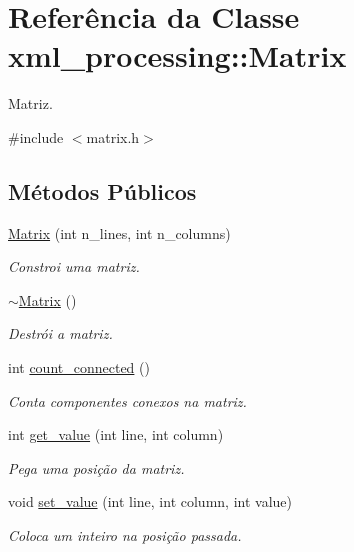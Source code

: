 \hypertarget{classxml__processing_1_1Matrix}{}\section{Referência da Classe xml\+\_\+processing\+:\+:Matrix}
\label{classxml__processing_1_1Matrix}


Matriz.  




{\ttfamily \#include $<$matrix.\+h$>$}

\subsection*{Métodos Públicos}
\begin{DoxyCompactItemize}
\item 
\hyperlink{classxml__processing_1_1Matrix_a5862906904cd901685f72cc703084d83}{Matrix} (int n\+\_\+lines, int n\+\_\+columns)
\begin{DoxyCompactList}\small\item\em Constroi uma matriz. \end{DoxyCompactList}\item 
\hyperlink{classxml__processing_1_1Matrix_a38b41757af695c49ed75cdfabfd85c55}{$\sim$\+Matrix} ()
\begin{DoxyCompactList}\small\item\em Destrói a matriz. \end{DoxyCompactList}\item 
int \hyperlink{classxml__processing_1_1Matrix_abdb4dca9e7b39f73ec02b45a5818905f}{count\+\_\+connected} ()
\begin{DoxyCompactList}\small\item\em Conta componentes conexos na matriz. \end{DoxyCompactList}\item 
int \hyperlink{classxml__processing_1_1Matrix_af11b820c974f7cb01372ce2f705ac3bd}{get\+\_\+value} (int line, int column)
\begin{DoxyCompactList}\small\item\em Pega uma posição da matriz. \end{DoxyCompactList}\item 
void \hyperlink{classxml__processing_1_1Matrix_a38208a596efd623f573cac470d703955}{set\+\_\+value} (int line, int column, int value)
\begin{DoxyCompactList}\small\item\em Coloca um inteiro na posição passada. \end{DoxyCompactList}\end{DoxyCompactItemize}


